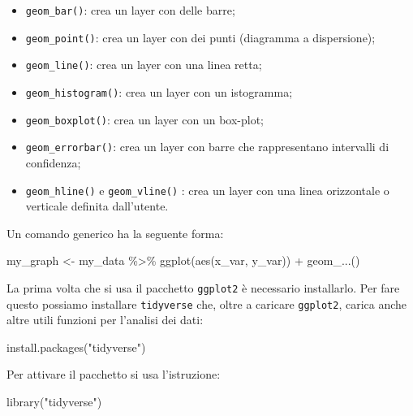 \documentclass[
]{memoir}
\newenvironment{Shaded}{\begin{snugshade}}{\end{snugshade}}
\newcommand{\FunctionTok}[1]{\textcolor[rgb]{0.00,0.00,0.00}{#1}}
\newcommand{\NormalTok}[1]{#1}
\newcommand{\OtherTok}[1]{\textcolor[rgb]{0.56,0.35,0.01}{#1}}
\newcommand{\SpecialCharTok}[1]{\textcolor[rgb]{0.00,0.00,0.00}{#1}}
\newcommand{\StringTok}[1]{\textcolor[rgb]{0.31,0.60,0.02}{#1}}
\theoremstyle{definition}
\theoremstyle{definition}
\theoremstyle{definition}
\theoremstyle{definition}
\theoremstyle{remark}
\begin{document}
\begin{itemize}
\item
  \texttt{geom\_bar()}: crea un layer con delle barre;
\item
  \texttt{geom\_point()}: crea un layer con dei punti (diagramma a dispersione);
\item
  \texttt{geom\_line()}: crea un layer con una linea retta;
\item
  \texttt{geom\_histogram()}: crea un layer con un istogramma;
\item
  \texttt{geom\_boxplot()}: crea un layer con un box-plot;
\item
  \texttt{geom\_errorbar()}: crea un layer con barre che rappresentano intervalli di confidenza;
\item
  \texttt{geom\_hline()} e \texttt{geom\_vline()} : crea un layer con una linea orizzontale o verticale definita dall'utente.
\end{itemize}

Un comando generico ha la seguente forma:

\begin{Shaded}
\begin{Highlighting}[]
\NormalTok{my\_graph }\OtherTok{\textless{}{-}}\NormalTok{ my\_data }\SpecialCharTok{\%\textgreater{}\%}
  \FunctionTok{ggplot}\NormalTok{(}\FunctionTok{aes}\NormalTok{(x\_var, y\_var)) }\SpecialCharTok{+}
  \FunctionTok{geom\_...}\NormalTok{()}
\end{Highlighting}
\end{Shaded}

La prima volta che si usa il pacchetto \texttt{ggplot2} è necessario installarlo. Per fare questo possiamo installare \texttt{tidyverse} che, oltre a caricare \texttt{ggplot2}, carica anche altre utili funzioni per l'analisi dei dati:

\begin{Shaded}
\begin{Highlighting}[]
\FunctionTok{install.packages}\NormalTok{(}\StringTok{"tidyverse"}\NormalTok{)}
\end{Highlighting}
\end{Shaded}

Per attivare il pacchetto si usa l'istruzione:

\begin{Shaded}
\begin{Highlighting}[]
\FunctionTok{library}\NormalTok{(}\StringTok{"tidyverse"}\NormalTok{)}
\end{Highlighting}
\end{Shaded}
\end{document}
